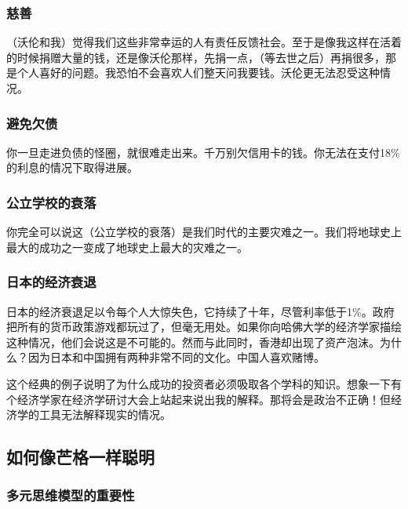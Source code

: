 \subsubsection*{慈善}

（沃伦和我）觉得我们这些非常幸运的人有责任反馈社会。至于是像我这样在活着的时候捐赠大量的钱，还是像沃伦那样，先捐一点，（等去世之后）再捐很多，那是个人喜好的问题。我恐怕不会喜欢人们整天问我要钱。沃伦更无法忍受这种情况。
\par

\subsubsection*{避免欠债}

你一旦走进负债的怪圈，就很难走出来。千万别欠信用卡的钱。你无法在支付18\%的利息的情况下取得进展。
\par

\subsubsection*{公立学校的衰落}

你完全可以说这（公立学校的衰落）是我们时代的主要灾难之一。我们将地球史上最大的成功之一变成了地球史上最大的灾难之一。
\par

\subsubsection*{日本的经济衰退}

日本的经济衰退足以令每个人大惊失色，它持续了十年，尽管利率低于1\%。政府把所有的货币政策游戏都玩过了，但毫无用处。如果你向哈佛大学的经济学家描绘这种情况，他们会说这是不可能的。然而与此同时，香港却出现了资产泡沫。为什么？因为日本和中国拥有两种非常不同的文化。中国人喜欢赌博。
\par

这个经典的例子说明了为什么成功的投资者必须吸取各个学科的知识。想象一下有个经济学家在经济学研讨大会上站起来说出我的解释。那将会是政治不正确！但经济学的工具无法解释现实的情况。
\par

\subsection*{如何像芒格一样聪明}

\subsubsection*{多元思维模型的重要性}

